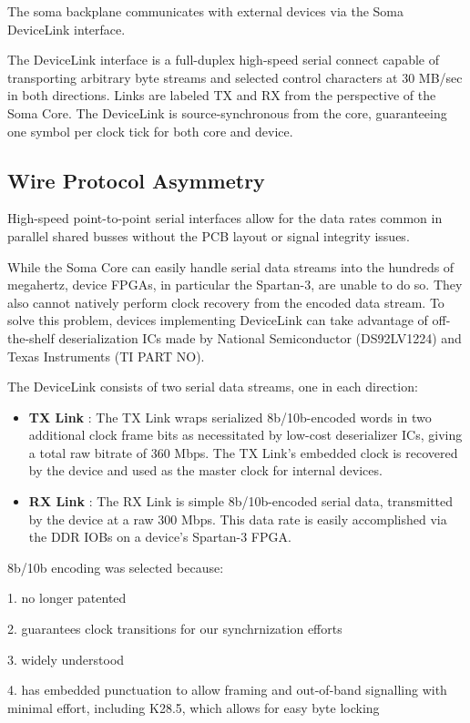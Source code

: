 
The soma backplane communicates with external devices via the Soma
DeviceLink interface.

The DeviceLink interface is a full-duplex high-speed serial connect
capable of transporting arbitrary byte streams and selected control
characters at 30 MB/sec in both directions. Links are labeled TX and
RX from the perspective of the Soma Core. The DeviceLink is
source-synchronous from the core, guaranteeing one symbol per clock
tick for both core and device.


\subsection{Wire Protocol Asymmetry}

High-speed point-to-point serial interfaces allow for the data rates
common in parallel shared busses without the PCB layout or signal
integrity issues. 

While the Soma Core can easily handle serial data streams into the
hundreds of megahertz, device FPGAs, in particular the Spartan-3, are
unable to do so. They also cannot natively perform clock recovery from
the encoded data stream. To solve this problem, devices implementing
DeviceLink can take advantage of off-the-shelf deserialization ICs made
by National Semiconductor (DS92LV1224) and Texas Instruments (TI PART
NO).

The DeviceLink consists of two serial data streams, one in each direction: 
\begin{itemize}
\item \textbf{TX Link} : The TX Link wraps serialized 8b/10b-encoded
  words in two additional clock frame bits as necessitated by low-cost
  deserializer ICs, giving a total raw bitrate of 360 Mbps. The TX
  Link's embedded clock is recovered by the device and used as the
  master clock for internal devices.
\item \textbf{RX Link} : The RX Link is simple 8b/10b-encoded serial
  data, transmitted by the device at a raw 300 Mbps. This data rate is
  easily accomplished via the DDR IOBs on a device's Spartan-3 FPGA.
\end{itemize}


8b/10b encoding was selected because: 

1. no longer patented 

2. guarantees clock transitions for our synchrnization efforts

3. widely understood 

4. has embedded punctuation to allow framing and out-of-band
   signalling with minimal effort, including K28.5, which allows for
   easy byte locking

